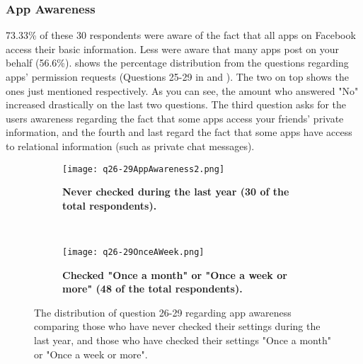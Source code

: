 \subsubsection{App Awareness}
73.33\% of these 30 respondents were aware of the fact that all apps on Facebook access their basic information. Less were aware that many apps post on your behalf (56.6\%).  shows the percentage distribution from the questions regarding apps' permission requests (Questions 25-29 in  and ). The two on top shows the ones just mentioned respectively. As you can see, the amount who answered "No" increased drastically on the last two questions. The third question asks for the users awareness regarding the fact that some apps access your friends' private information, and the fourth and last regard the fact that some apps have access to relational information (such as private chat messages). 


\begin{figure}
        \centering
        \begin{subfigure}[t]{0.5\textwidth}
            \texttt{[image: q26-29AppAwareness2.png]}
			\caption[The distribution of question 26-29, showing app 					awareness among the 30 respondents that have never checked 					their Facebook settings during the last year]
			{\textbf{Never checked during the last year (30 of the total				respondents).}} 
			\label{fig:appawarenessneverchecked}
		\end{subfigure}%
		 ~ %
        \begin{subfigure}[t]{0.46\textwidth}
            \texttt{[image: q26-29OnceAWeek.png]}
			\caption[The distribution of question 26-29 showing app 					awareness among the 48 respondents that checks their Facebook 			settings "Once a month" or "Once a week or more"]
			{\textbf{Checked "Once a month" or "Once a week or more" (48 				of the total respondents).}} 
			\label{fig:appawarenessonceaweek}
        \end{subfigure}
        \caption{The distribution of question 26-29 regarding app awareness comparing those who have never checked their settings during the last year, and those who have checked their settings "Once a month" or "Once a week or more".}
\label{fig:appawarenessinregardtohowoftentheycheck}
\end{figure}




